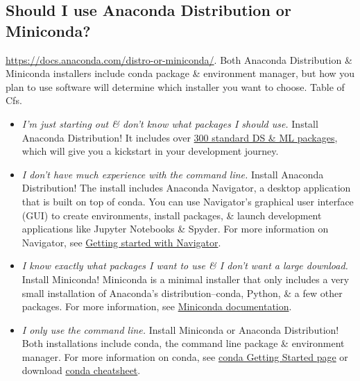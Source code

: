 \documentclass{article}
\begin{document}
\subsection{Should I use Anaconda Distribution or Miniconda?}
\url{https://docs.anaconda.com/distro-or-miniconda/}. Both Anaconda Distribution \& Miniconda installers include conda package \& environment manager, but how you plan to use software will determine which installer you want to choose. {\sf Table of Cfs.}

\begin{itemize}
	\item {\it I'm just starting out \& don't know what packages I should use.} Install Anaconda Distribution! It includes over \href{https://docs.anaconda.com/anaconda/release-notes/}{300 standard DS \& ML packages}, which will give you a kickstart in your development journey.
	\item {\it I don't have much experience with the command line.} Install Anaconda Distribution! The install includes Anaconda Navigator, a desktop application that is built on top of conda. You can use Navigator's graphical user interface (GUI) to create environments, install packages, \& launch development applications like Jupyter Notebooks \& Spyder. For more information on Navigator, see \href{https://docs.anaconda.com/navigator/getting-started/}{Getting started with Navigator}.
	\item {\it I know exactly what packages I want to use \& I don't want a large download.} Install Miniconda! Miniconda is a minimal installer that only includes a very small installation of Anaconda's distribution--conda, Python, \& a few other packages. For more information, see \href{https://docs.anaconda.com/miniconda/}{Miniconda documentation}.
	\item {\it I only use the command line.} Install Miniconda or Anaconda Distribution! Both installations include conda, the command line package \& environment manager. For more information on conda, see \href{https://conda.io/projects/conda/en/latest/user-guide/getting-started.html}{conda Getting Started page} or download \href{https://docs.conda.io/projects/conda/en/latest/user-guide/cheatsheet.html}{conda cheatsheet}.
\end{itemize}
\end{document}
